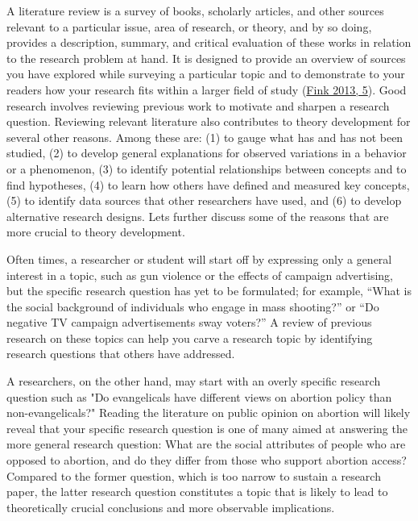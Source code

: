 \documentclass{book}
\begin{document}
A literature review is a survey of books, scholarly articles, and other
sources relevant to a particular issue, area of research, or theory, and by so
doing, provides a description, summary, and critical evaluation of these works
in relation to the research problem at hand. It is designed to provide an
overview of sources you have explored while surveying a particular topic and
to demonstrate to your readers how your research fits within a larger field of
study (\protect\hyperlink{ref-finkConductingResearchLiterature2013}{Fink 2013,
5}). Good research involves reviewing previous work to motivate and sharpen a
research question. Reviewing relevant literature also contributes to theory
development for several other reasons. Among these are: (1) to gauge what has
and has not been studied, (2) to develop general explanations for observed
variations in a behavior or a phenomenon, (3) to identify potential
relationships between concepts and to find hypotheses, (4) to learn how others
have defined and measured key concepts, (5) to identify data sources that
other researchers have used, and (6) to develop alternative research designs.
Lets further discuss some of the reasons that are more crucial to theory
development.

Often times, a researcher or student will start off by expressing only a
general interest in a topic, such as gun violence or the effects of campaign
advertising, but the specific research question has yet to be formulated; for
example, ``What is the social background of individuals who engage in mass
shooting?'' or ``Do negative TV campaign advertisements sway voters?'' A
review of previous research on these topics can help you carve a research
topic by identifying research questions that others have addressed.

A researchers, on the other hand, may start with an overly specific research
question such as "Do evangelicals have different views on abortion policy than
non-evangelicals?" Reading the literature on public opinion on abortion will
likely reveal that your specific research question is one of many aimed at
answering the more general research question: What are the social attributes
of people who are opposed to abortion, and do they differ from those who
support abortion access? Compared to the former question, which is too narrow
to sustain a research paper, the latter research question constitutes a topic
that is likely to lead to theoretically crucial conclusions and more
observable implications.
\end{document}
